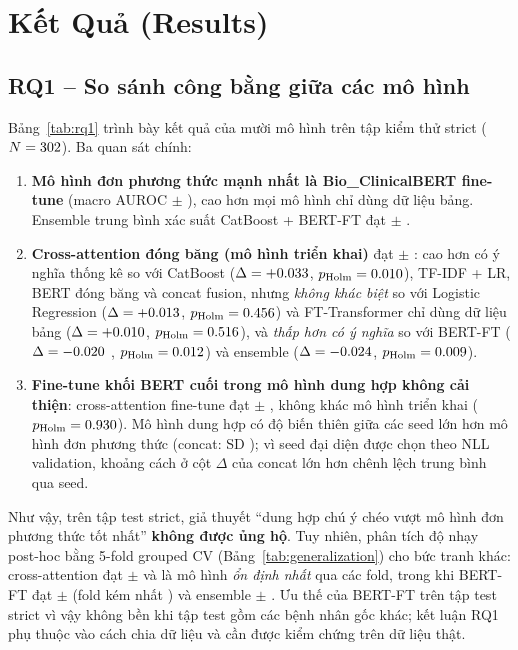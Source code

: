 \section{Kết Quả (Results)}
\label{sec:empirical_results}

\subsection{RQ1 -- So sánh công bằng giữa các mô hình}
Bảng~\ref{tab:rq1} trình bày kết quả của mười mô hình trên tập kiểm thử strict ($N=302$). Ba quan sát chính:
\begin{enumerate}[leftmargin=1.8em, itemsep=0.2em]
  \item \textbf{Mô hình đơn phương thức mạnh nhất là Bio\_ClinicalBERT fine-tune} (macro AUROC \aucBertFT{} $\pm$ \aucsdBertFT{}), cao hơn mọi mô hình chỉ dùng dữ liệu bảng. Ensemble trung bình xác suất CatBoost + BERT-FT đạt \aucEnsemble{} $\pm$ \aucsdEnsemble{}.
  \item \textbf{Cross-attention đóng băng (mô hình triển khai)} đạt \aucXattn{} $\pm$ \aucsdXattn{}: cao hơn có ý nghĩa thống kê so với CatBoost ($\Delta=+0.033$, $p_{\text{Holm}}=0.010$), TF-IDF + LR, BERT đóng băng và concat fusion, nhưng \emph{không khác biệt} so với Logistic Regression ($\Delta=+0.013{}$, $p_{\text{Holm}}=0.456$) và FT-Transformer chỉ dùng dữ liệu bảng ($\Delta=+0.010{}$, $p_{\text{Holm}}=0.516$), và \emph{thấp hơn có ý nghĩa} so với BERT-FT ($\Delta=-0.020{}$ \deltaciBertFT, $p_{\text{Holm}}=0.012$) và ensemble ($\Delta=-0.024{}$, $p_{\text{Holm}}=0.009$).
  \item \textbf{Fine-tune khối BERT cuối trong mô hình dung hợp không cải thiện}: cross-attention fine-tune đạt \aucXattnFT{} $\pm$ \aucsdXattnFT{}, không khác mô hình triển khai ($p_{\text{Holm}}=0.930$). Mô hình dung hợp có độ biến thiên giữa các seed lớn hơn mô hình đơn phương thức (concat: SD \aucsdConcat{}); vì seed đại diện được chọn theo NLL validation, khoảng cách ở cột $\Delta$ của concat lớn hơn chênh lệch trung bình qua seed.
\end{enumerate}
Như vậy, trên tập test strict, giả thuyết ``dung hợp chú ý chéo vượt mô hình đơn phương thức tốt nhất'' \textbf{không được ủng hộ}. Tuy nhiên, phân tích độ nhạy post-hoc bằng 5-fold grouped CV (Bảng~\ref{tab:generalization}) cho bức tranh khác: cross-attention đạt \cvXattn{} $\pm$ \cvsdXattn{} và là mô hình \emph{ổn định nhất} qua các fold, trong khi BERT-FT đạt \cvBertFT{} $\pm$ \cvsdBertFT{} (fold kém nhất \cvminBertFT) và ensemble \cvEnsemble{} $\pm$ \cvsdEnsemble. Ưu thế của BERT-FT trên tập test strict vì vậy không bền khi tập test gồm các bệnh nhân gốc khác; kết luận RQ1 phụ thuộc vào cách chia dữ liệu và cần được kiểm chứng trên dữ liệu thật.

